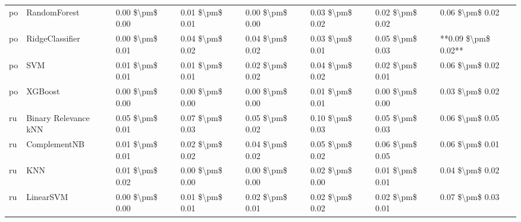 \begin{tabular}{llllllll}
      po &                    RandomForest & 0.00 \$\textbackslash pm\$ 0.00 &           0.01 \$\textbackslash pm\$ 0.01 &       0.00 \$\textbackslash pm\$ 0.00 &        0.03 \$\textbackslash pm\$ 0.02 &                         0.02 \$\textbackslash pm\$ 0.02 &     0.06 \$\textbackslash pm\$ 0.02 \\
      po &                 RidgeClassifier & 0.00 \$\textbackslash pm\$ 0.01 &           0.04 \$\textbackslash pm\$ 0.02 &       0.04 \$\textbackslash pm\$ 0.02 &        0.03 \$\textbackslash pm\$ 0.01 &                         0.05 \$\textbackslash pm\$ 0.03 & **0.09 \$\textbackslash pm\$ 0.02** \\
      po &                             SVM & 0.01 \$\textbackslash pm\$ 0.01 &           0.01 \$\textbackslash pm\$ 0.01 &       0.02 \$\textbackslash pm\$ 0.02 &        0.04 \$\textbackslash pm\$ 0.02 &                         0.02 \$\textbackslash pm\$ 0.01 &     0.06 \$\textbackslash pm\$ 0.02 \\
      po &                         XGBoost & 0.00 \$\textbackslash pm\$ 0.00 &           0.00 \$\textbackslash pm\$ 0.00 &       0.00 \$\textbackslash pm\$ 0.00 &        0.01 \$\textbackslash pm\$ 0.01 &                         0.00 \$\textbackslash pm\$ 0.00 &     0.03 \$\textbackslash pm\$ 0.02 \\
      ru &            Binary Relevance kNN & 0.05 \$\textbackslash pm\$ 0.01 &           0.07 \$\textbackslash pm\$ 0.03 &       0.05 \$\textbackslash pm\$ 0.02 &        0.10 \$\textbackslash pm\$ 0.03 &                         0.05 \$\textbackslash pm\$ 0.03 &     0.06 \$\textbackslash pm\$ 0.05 \\
      ru &                    ComplementNB & 0.01 \$\textbackslash pm\$ 0.01 &           0.02 \$\textbackslash pm\$ 0.02 &       0.04 \$\textbackslash pm\$ 0.02 &        0.05 \$\textbackslash pm\$ 0.02 &                         0.06 \$\textbackslash pm\$ 0.05 &     0.06 \$\textbackslash pm\$ 0.01 \\
      ru &                             KNN & 0.01 \$\textbackslash pm\$ 0.02 &           0.00 \$\textbackslash pm\$ 0.00 &       0.00 \$\textbackslash pm\$ 0.00 &        0.02 \$\textbackslash pm\$ 0.00 &                         0.01 \$\textbackslash pm\$ 0.01 &     0.04 \$\textbackslash pm\$ 0.02 \\
      ru &                       LinearSVM & 0.00 \$\textbackslash pm\$ 0.00 &           0.01 \$\textbackslash pm\$ 0.01 &       0.02 \$\textbackslash pm\$ 0.01 &        0.02 \$\textbackslash pm\$ 0.02 &                         0.02 \$\textbackslash pm\$ 0.01 &     0.07 \$\textbackslash pm\$ 0.03 \\

\end{tabular}
